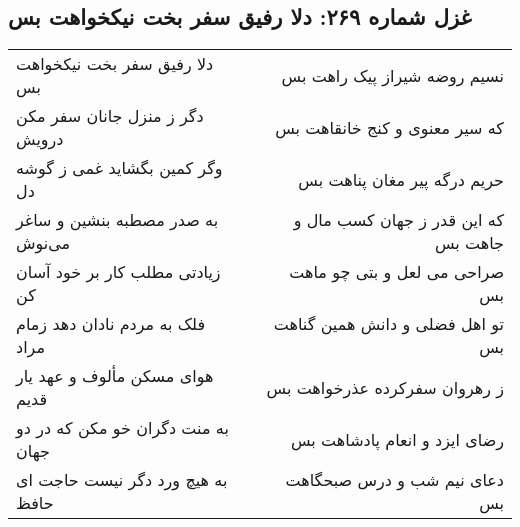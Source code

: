 \begin{center}
\section*{غزل شماره ۲۶۹: دلا رفیق سفر بخت نیکخواهت بس}
\label{sec:sh269}
\begin{longtable}{l p{0.5cm} r}
دلا رفیق سفر بخت نیکخواهت بس
&&
نسیم روضه شیراز پیک راهت بس
\\
دگر ز منزل جانان سفر مکن درویش
&&
که سیر معنوی و کنج خانقاهت بس
\\
وگر کمین بگشاید غمی ز گوشه دل
&&
حریم درگه پیر مغان پناهت بس
\\
به صدر مصطبه بنشین و ساغر می‌نوش
&&
که این قدر ز جهان کسب مال و جاهت بس
\\
زیادتی مطلب کار بر خود آسان کن
&&
صراحی می لعل و بتی چو ماهت بس
\\
فلک به مردم نادان دهد زمام مراد
&&
تو اهل فضلی و دانش همین گناهت بس
\\
هوای مسکن مألوف و عهد یار قدیم
&&
ز رهروان سفرکرده عذرخواهت بس
\\
به منت دگران خو مکن که در دو جهان
&&
رضای ایزد و انعام پادشاهت بس
\\
به هیچ ورد دگر نیست حاجت ای حافظ
&&
دعای نیم شب و درس صبحگاهت بس
\\
\end{longtable}
\end{center}
